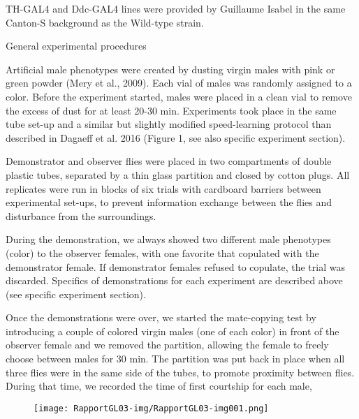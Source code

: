 \documentclass{article}
\begin{document}
TH-GAL4 and Ddc-GAL4 lines were provided by Guillaume Isabel in the same Canton-S background as the Wild-type strain.


\bigskip


\bigskip

General experimental procedures


\bigskip

Artificial male phenotypes were created by dusting virgin males with pink or green powder (Mery et al., 2009). Each vial of males was randomly assigned to a color. Before the experiment started, males were placed in a clean vial to remove the excess of dust for at least 20-30 min. Experiments took place in the same tube set-up and a similar but slightly modified speed-learning protocol than described in Dagaeff et al. 2016 (Figure 1, see also specific experiment section).

Demonstrator and observer flies were placed in two compartments of double plastic tubes, separated by a thin glass partition and closed by cotton plugs. All replicates were run in blocks of six trials with cardboard barriers between experimental set-ups, to prevent information exchange between the flies and disturbance from the surroundings. 

During the demonstration, we always showed two different male phenotypes (color) to the observer females, with one favorite that copulated with the demonstrator female. If demonstrator females refused to copulate, the trial was discarded. Specifics of demonstrations for each experiment are described above (see specific experiment section).


\bigskip

Once the demonstrations were over, we started the mate-copying test by introducing a couple of colored virgin males (one of each color) in front of the observer female and we removed the partition, allowing the female to freely choose between males for 30 min. The partition was put back in place when all three flies were in the same side of the tubes, to promote proximity between flies. During that time, we recorded the time of first courtship for each male, 



\begin{figure}
\centering
\texttt{[image: RapportGL03-img/RapportGL03-img001.png]}
\end{figure}

\bigskip


\bigskip
\end{document}
